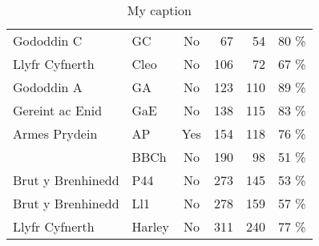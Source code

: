 \begin{table}[h]
\begin{tabular}{@{}llcrrr@{}}
Gododdin C                        & GC             & No                                     & 67                                       & 54                                   & 80                                   \% \\
Llyfr Cyfnerth                    & Cleo           & No                                     & 106                                      & 72                                   & 67                                   \% \\
Gododdin A                        & GA             & No                                     & 123                                      & 110                                  & 89                                   \% \\
Gereint ac Enid                   & GaE            & No                                     & 138                                      & 115                                  & 83                                   \% \\
Armes Prydein                     & AP             & Yes                                      & 154                                      & 118                                  & 76                                   \% \\
                                  & BBCh           & No                                     & 190                                      & 98                                   & 51                                   \% \\
Brut y Brenhinedd                 & P44            & No                                     & 273                                      & 145                                  & 53                                   \% \\
Brut y Brenhinedd                 & Ll1            & No                                     & 278                                      & 159                                  & 57                                   \% \\
Llyfr Cyfnerth                    & Harley         & No                                     & 311                                      & 240                                  & 77                                   \% \\ \bottomrule
\end{tabular}
\caption{My caption}
\label{my-label}
\end{table}